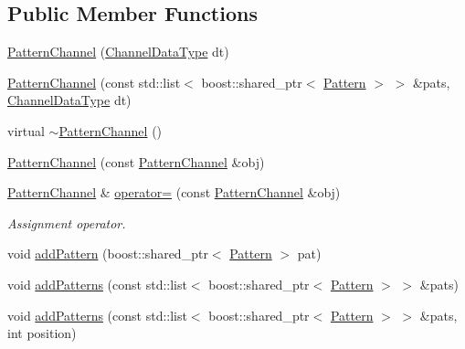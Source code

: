 \subsection*{\-Public \-Member \-Functions}
\begin{DoxyCompactItemize}
\item 
\hyperlink{classcryomesh_1_1state_1_1PatternChannel_a10d5404f3c3d7005d48f681552cca552}{\-Pattern\-Channel} (\hyperlink{classcryomesh_1_1state_1_1PatternChannel_ac8a0ae515a221519890fc1181f2c895a}{\-Channel\-Data\-Type} dt)
\item 
\hyperlink{classcryomesh_1_1state_1_1PatternChannel_a15701153fd6de84797aee5b6543e90ec}{\-Pattern\-Channel} (const std\-::list$<$ boost\-::shared\-\_\-ptr$<$ \hyperlink{classcryomesh_1_1state_1_1Pattern}{\-Pattern} $>$ $>$ \&pats, \hyperlink{classcryomesh_1_1state_1_1PatternChannel_ac8a0ae515a221519890fc1181f2c895a}{\-Channel\-Data\-Type} dt)
\item 
virtual \hyperlink{classcryomesh_1_1state_1_1PatternChannel_ad2f8eaa8b1925a9bab61181154511b51}{$\sim$\-Pattern\-Channel} ()
\item 
\hyperlink{classcryomesh_1_1state_1_1PatternChannel_a840ee854b5050c4034de97ee7625a562}{\-Pattern\-Channel} (const \hyperlink{classcryomesh_1_1state_1_1PatternChannel}{\-Pattern\-Channel} \&obj)
\item 
\hyperlink{classcryomesh_1_1state_1_1PatternChannel}{\-Pattern\-Channel} \& \hyperlink{classcryomesh_1_1state_1_1PatternChannel_a136a8a320b095ad9ce04eb67ea0a8c17}{operator=} (const \hyperlink{classcryomesh_1_1state_1_1PatternChannel}{\-Pattern\-Channel} \&obj)
\begin{DoxyCompactList}\small\item\em \-Assignment operator. \end{DoxyCompactList}\item 
void \hyperlink{classcryomesh_1_1state_1_1PatternChannel_ab8c96531bfdfa24facbec91e81fa0158}{add\-Pattern} (boost\-::shared\-\_\-ptr$<$ \hyperlink{classcryomesh_1_1state_1_1Pattern}{\-Pattern} $>$ pat)
\item 
void \hyperlink{classcryomesh_1_1state_1_1PatternChannel_a46b385352284ab06ea31c36bfb37a0ac}{add\-Patterns} (const std\-::list$<$ boost\-::shared\-\_\-ptr$<$ \hyperlink{classcryomesh_1_1state_1_1Pattern}{\-Pattern} $>$ $>$ \&pats)
\item 
void \hyperlink{classcryomesh_1_1state_1_1PatternChannel_a79780e5a353cd0e376d0a8abad93f8bd}{add\-Patterns} (const std\-::list$<$ boost\-::shared\-\_\-ptr$<$ \hyperlink{classcryomesh_1_1state_1_1Pattern}{\-Pattern} $>$ $>$ \&pats, int position)

\end{DoxyCompactItemize}
